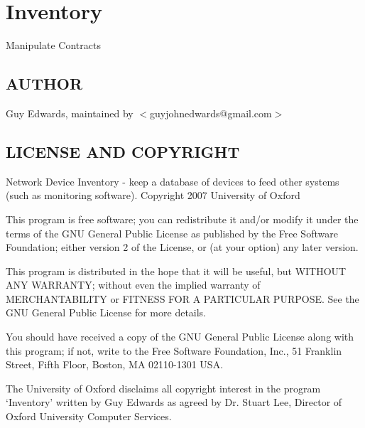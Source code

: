 \documentclass{book}
\begin{document}
\section{Inventory}
\label{_Inventory::Contracts}
\hypertarget{_Inventory::Contracts}{}



Manipulate Contracts


\subsection{AUTHOR}
\label{Inventory::Contracts_AUTHOR}
\hypertarget{Inventory::Contracts_AUTHOR}{}



Guy Edwards, maintained by $<$guyjohnedwards@gmail.com$>$


\subsection{LICENSE AND COPYRIGHT}
\label{Inventory::Contracts_LICENSE_AND_COPYRIGHT}
\hypertarget{Inventory::Contracts_LICENSE_AND_COPYRIGHT}{}



Network Device Inventory - keep a database of devices to feed other systems (such as monitoring software). Copyright 2007 University of Oxford



This program is free software; you can redistribute it and/or modify it under the terms of the GNU General Public License as published by the Free Software Foundation; either version 2 of the License, or (at your option) any later version.



This program is distributed in the hope that it will be useful, but WITHOUT ANY WARRANTY; without even the implied warranty of MERCHANTABILITY or FITNESS FOR A PARTICULAR PURPOSE. See the GNU General Public License for more details.



You should have received a copy of the GNU General Public License along with this program; if not, write to the Free Software Foundation, Inc., 51 Franklin Street, Fifth Floor, Boston, MA 02110-1301 USA.



The University of Oxford disclaims all copyright interest in the program `Inventory' written by Guy Edwards as agreed by Dr. Stuart Lee, Director of Oxford University Computer Services.
\end{document}
